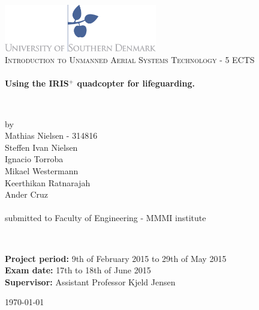\begin{titlepage}
\begin{center}

\includegraphics[width=0.5\textwidth]{./Images/logo.jpg}~\\[2cm]


\textsc{\Large Introduction to Unmanned Aerial Systems Technology - 5 ECTS}\\[1.5cm]

\HRule \\[0.4cm]
{ \huge \bfseries Using the IRIS$^{+}$ quadcopter for lifeguarding.  \\[0.4cm] }

\HRule \\[1.5cm]


\begin{center}
\begin{minipage}{0.5\textwidth} 
\large 
\center
 by\\
\LARGE
Mathias Nielsen - 314816\\
\LARGE
Steffen Ivan Nielsen\\ 
\LARGE
Ignacio Torroba\\
\LARGE
Mikael Westermann \\
\LARGE
Keerthikan Ratnarajah \\ 
\LARGE
Ander Cruz \\
\large
~\\
submitted to Faculty of Engineering - MMMI institute 

\end{minipage}
\end{center}

~\\[3cm]

\begin{flushleft}
\begin{minipage}{1\textwidth}
\large

\textbf{Project period:} 9th of February 2015 to 29th of May 2015\\[0.3cm]
\textbf{Exam date:} 17th to 18th of June 2015\\[0.3cm]
\textbf{Supervisor:} Assistant Professor Kjeld Jensen\\

\end{minipage}

\end{flushleft}

\vfill

{\large \today}
\end{center}
\end{titlepage}